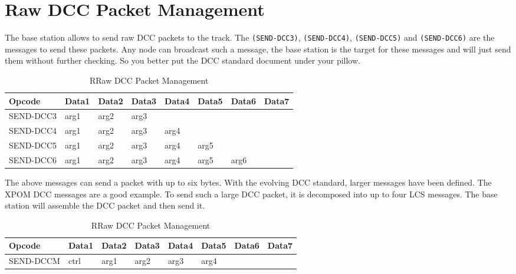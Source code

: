 \section{Raw DCC Packet Management}

The base station allows to send raw DCC packets to the track. The \texttt{(SEND-DCC3)}, \texttt{(SEND-DCC4)}, \texttt{(SEND-DCC5)} and \texttt{(SEND-DCC6)} are the messages to send these packets. Any node can broadcast such a message, the base station is the target for these messages and will just send them without further checking. So you better put the DCC standard document under your pillow.

\begin{table}[ht!]
    \begin{center}
        \caption{RRaw DCC Packet Management}
        \begin{tabular}{|l|l|l|l|l|l|l|l|}
            \toprule
            \textbf{Opcode}  & \textbf{Data1} & \textbf{Data2} & \textbf{Data3} & \textbf{Data4} & \textbf{Data5} & \textbf{Data6} & \textbf{Data7} \\
            \midrule
            SEND-DCC3 & arg1 & arg2 & arg3 & & & & \\
            SEND-DCC4 & arg1 & arg2 & arg3 & arg4 & & & \\
            SEND-DCC5 & arg1 & arg2 & arg3 & arg4 & arg5 & & \\
            SEND-DCC6 & arg1 & arg2 & arg3 & arg4 & arg5 & arg6 & \\
            \bottomrule
        \end{tabular}
    \end{center}
\end{table}

The above messages can send a packet with up to six bytes. With the evolving DCC standard, larger messages have been defined. The XPOM DCC messages are a good example. To send such a large DCC packet, it is decomposed into up to four LCS messages. The base station will assemble the DCC packet and then send it. 

\begin{table}[ht!]
    \begin{center}
        \caption{RRaw DCC Packet Management}
        \begin{tabular}{|l|l|l|l|l|l|l|l|}
            \toprule
            \textbf{Opcode}  & \textbf{Data1} & \textbf{Data2} & \textbf{Data3} & \textbf{Data4} & \textbf{Data5} & \textbf{Data6} & \textbf{Data7} \\
            \midrule
            SEND-DCCM & ctrl & arg1 & arg2 & arg3 & arg4 & & \\
            \bottomrule
        \end{tabular}
    \end{center}
\end{table}

